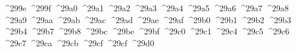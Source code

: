 {  ^^^^299e%
  ^^^^299f%
  ^^^^29a0%
  ^^^^29a1%
  ^^^^29a2%
  ^^^^29a3%
  ^^^^29a4%
  ^^^^29a5%
  ^^^^29a6%
  ^^^^29a7%
  ^^^^29a8%
  ^^^^29a9%
  ^^^^29aa%
  ^^^^29ab%
  ^^^^29ac%
  ^^^^29ad%
  ^^^^29ae%
  ^^^^29af%
  ^^^^29b0%
  ^^^^29b1%
  ^^^^29b2%
  ^^^^29b3%
  ^^^^29b4%
  ^^^^29b7%
  ^^^^29b8%
  ^^^^29bc%
  ^^^^29be%
  ^^^^29bf%
  ^^^^29c0%
  ^^^^29c1%
  ^^^^29c4%
  ^^^^29c5%
  ^^^^29c6%
  ^^^^29c7%
  ^^^^29ca%
  ^^^^29cb%
  ^^^^29cf%
  ^^^^29cf%
  ^^^^29d0%
}
